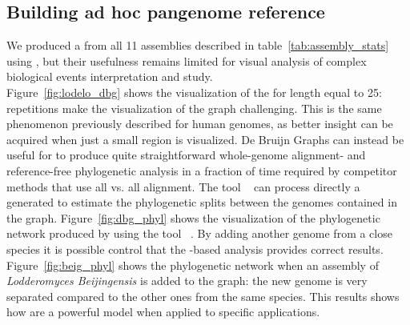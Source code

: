 \subsection{Building ad hoc pangenome reference}
We produced a \dbg from all 11 assemblies described in table~\ref{tab:assembly_stats} using \bifrost, but their usefulness remains limited for visual analysis of complex biological events interpretation and study.\\
Figure~\ref{fig:lodelo_dbg} shows the visualization of the \dbg for \kmer length equal to 25: repetitions make the visualization of the graph challenging. This is the same phenomenon previously described for human genomes, as better insight can be acquired when just a small region is visualized. 
De Bruijn Graphs can instead be useful for to produce quite straightforward whole-genome alignment- and reference-free phylogenetic analysis in a fraction of time required by competitor methods that use all vs. all alignment. The tool \sans~\cite{sans} can process directly a \bifrost generated \ccdbg to estimate the phylogenetic splits between the genomes contained in the graph. Figure~\ref{fig:dbg_phyl} shows the visualization of the phylogenetic network produced by \sans using the tool \splitstree~\cite{splitstree}. By adding another genome from a close species it is possible control that the \dbg-based analysis provides correct results. Figure~\ref{fig:beig_phyl} shows the phylogenetic network when an assembly of \emph{Lodderomyces Beijingensis} is added to the graph: the new genome is very separated compared to the other ones from the same species. This results shows how \dbgs are a powerful model when applied to specific applications.\\

